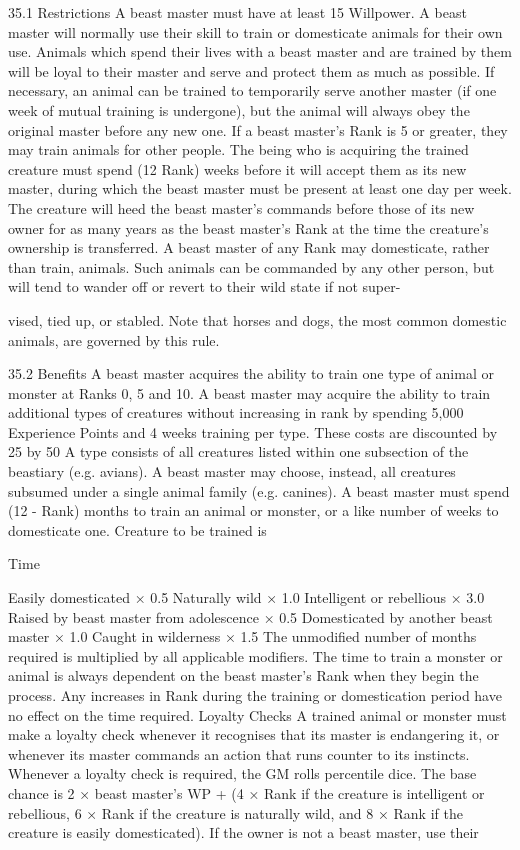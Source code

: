\documentclass[a4paper]{article}
\begin{document}
\begin{multicols}{3}
35.1 Restrictions
A beast master must have at least 15 Willpower.
A beast master will normally use their skill to train
or domesticate animals for their own use. Animals
which spend their lives with a beast master and are
trained by them will be loyal to their master and
serve and protect them as much as possible. If
necessary, an animal can be trained to temporarily
serve another master (if one week of mutual training is undergone), but the animal will always obey
the original master before any new one.
If a beast master’s Rank is 5 or greater, they may
train animals for other people. The being who is
acquiring the trained creature must spend (12 Rank) weeks before it will accept them as its new
master, during which the beast master must be
present at least one day per week. The creature will
heed the beast master’s commands before those of
its new owner for as many years as the beast master’s Rank at the time the creature’s ownership is
transferred.
A beast master of any Rank may domesticate,
rather than train, animals. Such animals can be
commanded by any other person, but will tend to
wander off or revert to their wild state if not super-

vised, tied up, or stabled. Note that horses and
dogs, the most common domestic animals, are
governed by this rule.

35.2 Benefits
A beast master acquires the ability to train one
type of animal or monster at Ranks 0, 5 and 10.
A beast master may acquire the ability to train
additional types of creatures without increasing in
rank by spending 5,000 Experience Points and 4
weeks training per type. These costs are discounted
by 25%
by 50%
A type consists of all creatures listed within one
subsection of the beastiary (e.g. avians). A beast
master may choose, instead, all creatures subsumed
under a single animal family (e.g. canines).
A beast master must spend (12 - Rank) months to
train an animal or monster, or a like number of
weeks to domesticate one.
Creature to be trained is

Time

Easily domesticated
× 0.5
Naturally wild
× 1.0
Intelligent or rebellious
× 3.0
Raised by beast master from adolescence × 0.5
Domesticated by another beast master
× 1.0
Caught in wilderness
× 1.5
The unmodified number of months required is
multiplied by all applicable modifiers. The time to
train a monster or animal is always dependent on
the beast master’s Rank when they begin the process. Any increases in Rank during the training or
domestication period have no effect on the time
required.
Loyalty Checks
A trained animal or monster must make a loyalty
check whenever it recognises that its master is
endangering it, or whenever its master commands
an action that runs counter to its instincts. Whenever a loyalty check is required, the GM rolls percentile dice. The base chance is 2 × beast master’s
WP + (4 × Rank if the creature is intelligent or
rebellious, 6 × Rank if the creature is naturally
wild, and 8 × Rank if the creature is easily domesticated). If the owner is not a beast master, use their


\end{multicols}
\end{document}
